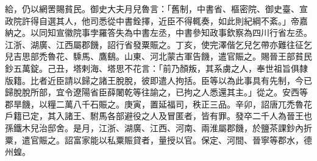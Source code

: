 \begin{pinyinscope}
給，仍以網罟賜貧民。御史大夫月兒魯言：「舊制，中書省、樞密院、御史臺、宣政院許得自選其人，他司悉從中書銓擇，近臣不得輒奏，如此則紀綱不紊。」帝嘉納之。以同知宣徽院事孛羅答失為中書左丞，中書參知政事欽察為四川行省左丞。江浙、湖廣、江西屬郡饑，詔行省發粟賑之。丁亥，使完澤偕乞兒乞帶亦難往征乞兒吉思部禿魯花、騬馬、鷹鷂。山東、河北蒙古軍告饑，遣官賑之。賜晉王部貧民鈔五萬錠。己丑，塔剌海、塔思不花言：「前乃顏叛，其系虜之人，奉世祖旨俱隸版籍。比者近臣請以歸之諸王脫脫，彼即遣人拘括。臣等以為此事具有先制，今已歸脫脫所部，宜令遼陽省臣薛闍乾等往諭之，已拘之人悉還其主。」從之。安西等郡旱饑，以糧二萬八千石賑之。庚寅，置延福司，秩正三品。辛卯，詔唐兀禿魯花戶籍已定，其入諸王、駙馬各部避役之人及冒匿者，皆有罪。發卒二千人為晉王也孫鐵木兒治邸舍。是月，江浙、湖廣、江西、河南、兩淮屬郡饑，於鹽茶課鈔內折粟，遣官賑之。詔富家能以私粟賑貸者，量授以官。保定、河間、晉寧等郡水，德州蝗。




\end{pinyinscope}
